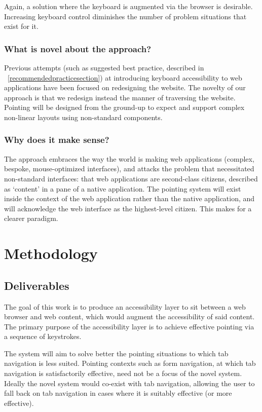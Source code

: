 \documentclass[a4paper, 11pt]{article}
\begin{document}
Again, a solution where the keyboard is augmented via the browser is desirable. Increasing keyboard control diminishes the number of problem situations that exist for it.

\subsubsection{What is novel about the approach?}
Previous attempts (such as suggested best practice, described in ~\cref{recommendedpracticesection}) at introducing keyboard accessibility to web applications have been focused on redesigning the website. The novelty of our approach is that we redesign instead the manner of traversing the website. Pointing will be designed from the ground-up to expect and support complex non-linear layouts using non-standard components.
\subsubsection{Why does it make sense?}
The approach embraces the way the world is making web applications (complex, bespoke, mouse-optimized interfaces), and attacks the problem that necessitated non-standard interfaces: that web applications are second-class citizens, described as `content' in a pane of a native application.
The pointing system will exist inside the context of the web application rather than the native application, and will acknowledge the web interface as the highest-level citizen. This makes for a clearer paradigm.
\section{Methodology}
\subsection{Deliverables}
The goal of this work is to produce an accessibility layer to sit between a web browser and web content, which would augment the accessibility of said content.
The primary purpose of the accessibility layer is to achieve effective pointing via a sequence of keystrokes.

The system will aim to solve better the pointing situations to which tab navigation is less suited. Pointing contexts such as form navigation, at which tab navigation is satisfactorily effective, need not be a focus of the novel system. Ideally the novel system would co-exist with tab navigation, allowing the user to fall back on tab navigation in cases where it is suitably effective (or more effective).
\end{document}
